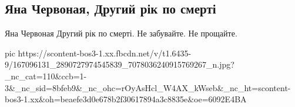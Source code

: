  
 
 
 
 

\subsection{Яна Червоная, Другий рік по смерті}
\label{sec:02_04_2021.fb.makarenko_oksana.2.smert_chervonaja_jana_2_goda}

Яна Червоная
Другий рік по смерті.
Не забувайте. Не прощайте.


\ifcmt
  pic https://scontent-bos3-1.xx.fbcdn.net/v/t1.6435-9/167096131_2890727974545839_7078036240915769267_n.jpg?_nc_cat=110&ccb=1-3&_nc_sid=8bfeb9&_nc_ohc=rOyAsHcl_W4AX_kWseb&_nc_ht=scontent-bos3-1.xx&oh=beaefe3d0e678b2f30617894a3c8835e&oe=6092E4BA
\fi

